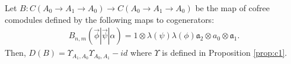 %
\begin{prop}
\label{prop:c2}
Let 
$B:C(A_0 \to A_1 \to A_0)
\longrightarrow C(A_0 \to A_1 \to A_0)$ 
be the map of cofree comodules defined by 
the following maps to cogenerators:
\begin{align*}
B_{n, m} (\vec{\phi} | \vec{\psi} | \alpha) 
= 1 \otimes \lambda(\psi)\lambda(\phi) \mathfrak{a}_2 \otimes a_0 \otimes \mathfrak{a}_1.
\end{align*}
Then, $D(B) = \Upsilon_{A_1,A_0}\Upsilon_{A_0,A_1} - id$ where
$\Upsilon$ is defined in Proposition 
\ref{prop:c1}.
\end{prop}
%
